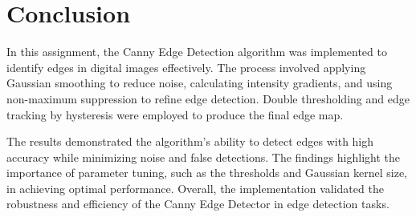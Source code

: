 
\section{Conclusion}
\label{sec:conclusion}

In this assignment, the Canny Edge Detection algorithm was implemented to identify edges in digital images effectively. The process involved applying Gaussian smoothing to reduce noise, calculating intensity gradients, and using non-maximum suppression to refine edge detection. Double thresholding and edge tracking by hysteresis were employed to produce the final edge map.

The results demonstrated the algorithm's ability to detect edges with high accuracy while minimizing noise and false detections. The findings highlight the importance of parameter tuning, such as the thresholds and Gaussian kernel size, in achieving optimal performance. Overall, the implementation validated the robustness and efficiency of the Canny Edge Detector in edge detection tasks.


\printbibliography[heading=bibintoc, title={References}]
